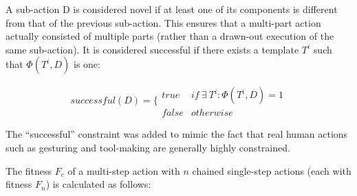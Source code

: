 \documentclass[a4paper,12pt,man,british]{apa6}
\begin{document}
A sub-action D is considered novel if at least one of its components is different from that of the previous sub-action. This ensures that a multi-part action actually consisted of multiple parts (rather than a drawn-out execution of the same sub-action). It is considered successful if there exists a template $T^i$ such that $\Phi(T^i,D)$ is one:

\begin{equation}
successful(D) = \bigg\{ \begin{matrix}
	true & if \ \exists \ T^i : \Phi(T^i,D) = 1 \\
	false & otherwise 
\end{matrix}
\label{eq:chaining}
\end{equation}


\bigskip \noindent The ``successful'' constraint was added to mimic the fact that real human actions such as gesturing and tool-making are generally highly constrained. 



The fitness $F_c$ of a multi-step action with $n$ chained single-step actions (each with fitness $F_n$) is calculated as follows:
\end{document}
